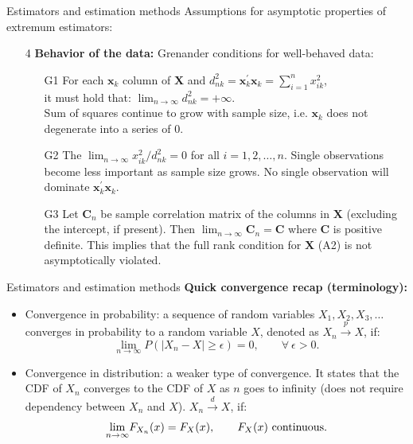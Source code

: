 \documentclass{beamer}
\begin{document}
\begin{frame}{Estimators and estimation methods}
Assumptions for asymptotic properties of extremum estimators:
\medskip
\begin{itemize}
    \item[4] \textbf{Behavior of the data:} Grenander conditions for well-behaved data:
    \medskip
    \begin{itemize}
        \item[G1] For each $\bm{x}_k$ column of $\bm{X}$ and $d_{nk}^2 = \bm{x}_k^{\prime}\bm{x}_k = \sum_{i=1}^n x_{ik}^2$, \\it must hold that: $\lim_{n \rightarrow \infty} d_{nk}^2 = + \infty$.\\ Sum of squares continue to grow with sample size, i.e. $\bm{x}_k$ does not degenerate into a series of 0.
        \smallskip
        \item[G2] The $\lim_{n \rightarrow \infty} x_{ik}^2 / d_{nk}^2 = 0$ for all $i=1,2,\dots,n$. Single observations become less important as sample size grows. No single observation will dominate $\bm{x}_k^{\prime}\bm{x}_k$.
        \smallskip
        \item[G3] Let $\bm{C}_n$ be sample correlation matrix of the columns in $\bm{X}$ (excluding the intercept, if present). Then $\lim_{n \rightarrow \infty} \bm{C}_n = \bm{C}$ where $\bm{C}$ is positive definite. This implies that the full rank condition for $\bm{X}$ (A2) is not asymptotically violated.
    \end{itemize}
\end{itemize}
\end{frame}
\begin{frame}{Estimators and estimation methods}
\textbf{Quick convergence recap (terminology):} \\ \bigskip
\begin{itemize}
\item Convergence in probability: a sequence of random variables $X_1, X_2, X_3, \dots$ converges in probability to a random variable $X$, denoted as $X_n \overset{p}{\rightarrow} X$, if:
$$
\underset{n \rightarrow \infty}{\lim} P (|X_n - X| \geq \epsilon)=0, \qquad \forall~ \epsilon > 0.
$$
\smallskip
\item Convergence in distribution: a weaker type of convergence. It states that the CDF of $X_n$ converges to the CDF of $X$ as $n$ goes to infinity (does not require dependency between $X_n$ and $X$). $X_n \overset{d}{\rightarrow} X$, if: 
$$
\underset{n \rightarrow \infty}{\lim} F_{X_n}(x) = F_X(x), \qquad F_X(x) \textnormal{~continuous.}
$$
\end{itemize}
\end{frame}
\end{document}

